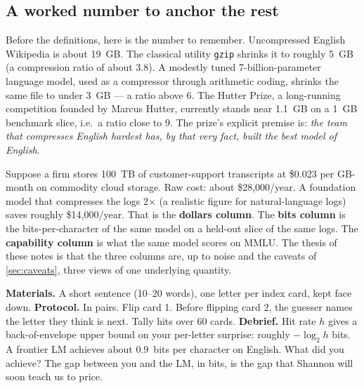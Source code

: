 \subsection*{A worked number to anchor the rest}

Before the definitions, here is the number to remember.
Uncompressed English Wikipedia is about 19~GB. The classical utility
\texttt{gzip} shrinks it to roughly 5~GB (a compression ratio of
about 3.8). A modestly tuned 7-billion-parameter language model, used
as a compressor through arithmetic coding, shrinks the same file to
under 3~GB --- a ratio above 6. The Hutter Prize, a long-running
competition founded by Marcus Hutter, currently stands near 1.1~GB
on a 1~GB benchmark slice, i.e.\ a ratio close to 9. The prize's
explicit premise is: \emph{the team that compresses English hardest
has, by that very fact, built the best model of English}.
\citep{hutter2006prize}

\begin{example}
\label{ex:three-currencies}
Suppose a firm stores 100~TB of customer-support transcripts at
\$0.023 per GB-month on commodity cloud storage. Raw cost:
about \$28{,}000/year. A foundation model that compresses the logs
2$\times$ (a realistic figure for natural-language logs) saves
roughly \$14{,}000/year. That is the \textbf{dollars column}.
The \textbf{bits column} is the bits-per-character of the same
model on a held-out slice of the same logs. The \textbf{capability
column} is what the same model scores on MMLU. The thesis of these
notes is that the three columns are, up to noise and the caveats of
\cref{sec:caveats}, three views of one underlying quantity.
\end{example}

\begin{activity}[title={Activity A1 --- Guess the next letter}]
\textbf{Materials.} A short sentence (10--20 words), one letter per
index card, kept face down.
\textbf{Protocol.} In pairs. Flip card 1. Before flipping card 2,
the guesser names the letter they think is next. Tally hits over 60
cards.
\textbf{Debrief.} Hit rate $h$ gives a back-of-envelope upper bound
on your per-letter surprise: roughly $-\log_2 h$ bits. A frontier LM
achieves about 0.9~bits per character on English. What did you
achieve? The gap between you and the LM, in bits, is the gap that
Shannon will soon teach us to price.
\end{activity}

